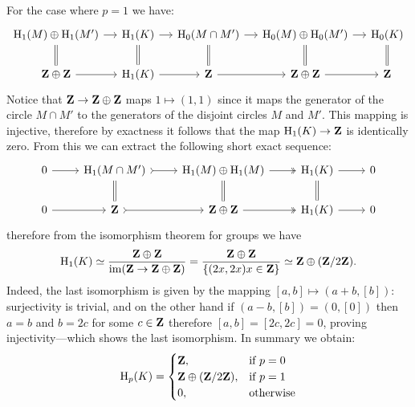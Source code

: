 \begin{example}
For the case where \(p=1\) we have:
\[
\begin{tikzcd}[column sep=small]
\Hmlg_1(M) \oplus \Hmlg_1(M') \ar[d, equals] \ar[r]
&\Hmlg_1(K) \ar[d, equals] \ar[r]
&\Hmlg_0(M \cap M') \ar[d, equals] \ar[r]
&\Hmlg_0(M) \oplus \Hmlg_0(M') \ar[r] \ar[d, equals]
&\Hmlg_0(K) \ar[d, equals]
\\
\Z \oplus \Z
\ar[r]
&\Hmlg_1(K)
\ar[r]
&\Z \ar[r]
&\Z \oplus \Z \ar[r]
&\Z
\end{tikzcd}
\]
Notice that \(\mathbf{Z} \to \mathbf{Z} \oplus \mathbf{Z}\) maps \(1 \mapsto (1, 1)\) since it maps the generator of
the circle \(M \cap M'\) to the generators of the disjoint circles \(M\) and
\(M'\). This mapping is injective, therefore by
exactness it follows that the map \(\operatorname{H}_1(K) \to \mathbf{Z}\) is identically zero. From
this we can extract the following short exact sequence:
\[
\begin{tikzcd}
0 \ar[r]
&\Hmlg_1(M \cap M') \ar[r, tail] \ar[d, equals]
&\Hmlg_1(M) \oplus \Hmlg_1(M) \ar[r, two heads] \ar[d, equals]
&\Hmlg_1(K) \ar[r] \ar[d, equals]
&0
\\
0 \ar[r]
&\Z \ar[r, tail]
&\Z \oplus \Z \ar[r, two heads]
&\Hmlg_1(K) \ar[r]
&0
\end{tikzcd}
\]
therefore from the isomorphism theorem for groups we have
\[
\operatorname{H}_1(K)
\simeq \frac{\mathbf{Z} \oplus \mathbf{Z}}{\operatorname{im}(\mathbf{Z} \to \mathbf{Z} \oplus \mathbf{Z})}
= \frac{\mathbf{Z} \oplus \mathbf{Z}}{\{(2x, 2x) \relax x \in \mathbf{Z}\}}
\simeq \mathbf{Z} \oplus (\mathbf{Z}/2\mathbf{Z}).
\]
Indeed, the last isomorphism is given by the mapping
\([a, b] \mapsto (a + b, [b])\): surjectivity is trivial, and on the other hand if
\((a - b, [b]) = (0, [0])\) then \(a = b\) and \(b = 2c\) for some \(c \in \mathbf{Z}\)
therefore \([a, b] = [2c, 2c] = 0\), proving injectivity---which shows the last
isomorphism. In summary we obtain:
\[
\operatorname{H}_p(K) =
\begin{cases}
  \mathbf{Z},            &\text{if } p = 0 \\
  \mathbf{Z} \oplus (\mathbf{Z}/2\mathbf{Z}), &\text{if } p = 1 \\
  0,             &\text{otherwise}
\end{cases}
\]
\end{example}

